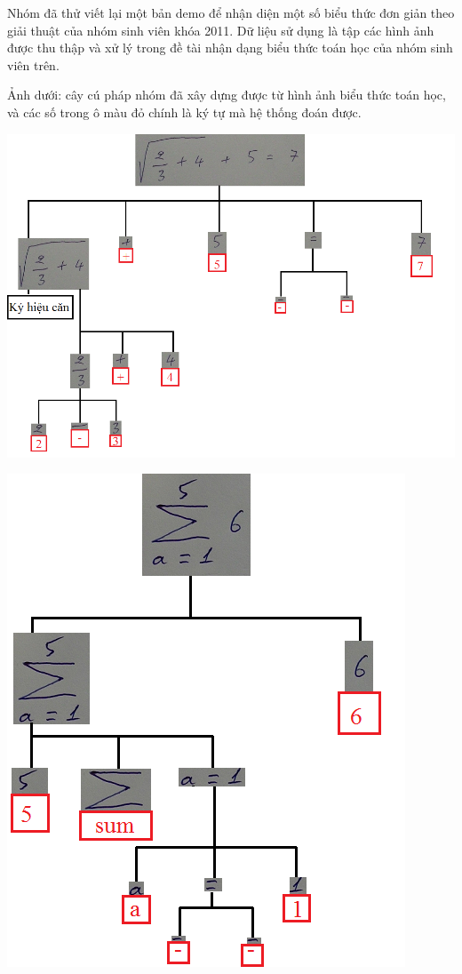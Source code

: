 \documentclass[a4paper,12pt]{article}
\begin{document}
	Nhóm đã thử viết lại một bản demo để nhận diện một số biểu thức đơn giản theo giải thuật của nhóm sinh viên khóa 2011. Dữ liệu sử dụng là tập các hình ảnh được thu thập và xử lý trong đề tài nhận dạng biểu thức toán học của nhóm sinh viên trên.
	
	Ảnh dưới: cây cú pháp nhóm đã xây dựng được từ hình ảnh biểu thức toán học, và các số trong ô màu đỏ chính là ký tự mà hệ thống đoán được.\par
	
	\begin{center}
		
		\centering
		\includegraphics[width=0.8\linewidth]{kq_1_1.png}
		\vspace{0.5cm}
	\end{center}
	
	\newpage
	\begin{center}
		
		\centering
		\includegraphics[width=0.8\linewidth]{kq_2_1.png}
		\vspace{0.5cm}
	\end{center}
	\vspace{0.5cm}
\end{document}
